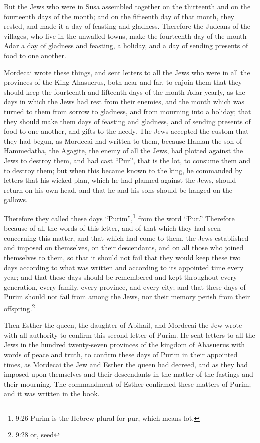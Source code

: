 \myverse{}But the Jews who were in Susa assembled together on the thirteenth
and on the fourteenth days of the month; and on the fifteenth day of that month, they rested, and made
it a day of feasting and gladness.
\myverse{}Therefore the Judeans of the villages, who live in the unwalled towns, make
the fourteenth day of the month Adar a day of gladness and feasting, a holiday, and a day of sending presents
of food to one another.

\myverse{}Mordecai wrote these things, and sent letters to all the Jews
who were in all the provinces of the King Ahasuerus, both near and far,
\myverse{}to enjoin them that they should keep the fourteenth and fifteenth days of
the month Adar yearly,
\myverse{}as the days in which the Jews had rest from their enemies, and the month which
was turned to them from sorrow to gladness, and from mourning into a holiday; that they should make them
days of feasting and gladness, and of sending presents of food to one another, and gifts to the needy.
\myverse{}The Jews accepted the custom that they had begun, as Mordecai had written
to them,
\myverse{}because Haman the son of Hammedatha, the Agagite, the enemy of all the Jews,
had plotted against the Jews to destroy them, and had cast “Pur”, that is the lot, to consume them and
to destroy them;
\myverse{}but when this became known to the king, he commanded by letters that his wicked
plan, which he had planned against the Jews, should return on his own head, and that he and his sons should
be hanged on the gallows.

\myverse{}Therefore they called these days “Purim”,\footnote{9:26 Purim is the Hebrew plural for pur, which means lot.} from the word “Pur.” Therefore
because of all the words of this letter, and of that which they had seen concerning this matter, and that
which had come to them,
\myverse{}the Jews established and imposed on themselves, on their descendants, and
on all those who joined themselves to them, so that it should not fail that they would keep these two
days according to what was written and according to its appointed time every year;
\myverse{}and that these days should be remembered and kept throughout every generation,
every family, every province, and every city; and that these days of Purim should not fail from among
the Jews, nor their memory perish from their offspring.\footnote{9:28 or, seed}

\myverse{}Then Esther the queen, the daughter of Abihail, and Mordecai
the Jew wrote with all authority to confirm this second letter of Purim.
\myverse{}He sent letters to all the Jews in the hundred twenty-seven provinces of the
kingdom of Ahasuerus with words of peace and truth,
\myverse{}to confirm these days of Purim in their appointed times, as Mordecai the Jew
and Esther the queen had decreed, and as they had imposed upon themselves and their descendants in the
matter of the fastings and their mourning.
\myverse{}The commandment of Esther confirmed these matters of Purim; and it was written
in the book.


